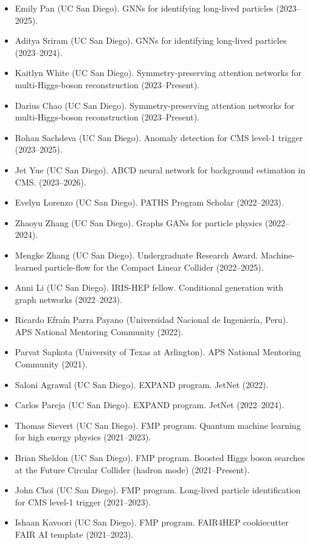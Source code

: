 \documentclass[11pt]{res}
\begin{document}
\begin{resume}
\begin{itemize}
    \item Emily Pan (UC San Diego). GNNs for identifying long-lived particles (2023--2025).
    \item Aditya Sriram (UC San Diego). GNNs for identifying long-lived particles (2023--2024).
    \item Kaitlyn White (UC San Diego). Symmetry-preserving attention networks for multi-Higgs-boson reconstruction (2023--Present).
    \item Darius Chao (UC San Diego). Symmetry-preserving attention networks for multi-Higgs-boson reconstruction (2023--Present).
    \item Rohan Sachdeva (UC San Diego). Anomaly detection for CMS level-1 trigger (2023--2025).
    \item Jet Yue (UC San Diego). ABCD neural network for background estimation in CMS. ({2023--2026}).
    \item Evelyn Lorenzo (UC San Diego). PATHS Program Scholar (2022--2023).
    \item Zhaoyu Zhang (UC San Diego). Graphs GANs for particle physics ({2022--2024}).
    \item Mengke Zhang (UC San Diego). Undergraduate Research Award. Machine-learned particle-flow for the Compact Linear Collider ({2022--2025}).
    \item Anni Li (UC San Diego). IRIS-HEP fellow. Conditional generation with graph networks ({2022--2023}).
    \item Ricardo Efra\'{i}n Parra Payano (Universidad Nacional de Ingenier\'{i}a, Peru). APS National Mentoring Community ({2022}).
    \item Parvat Sapkota (University of Texas at Arlington). APS National Mentoring Community ({2021}).
    \item Saloni Agrawal (UC San Diego). EXPAND program. JetNet ({2022}).
    \item Carlos Pareja (UC San Diego). EXPAND program. JetNet ({2022--2024}).
    \item Thomas Sievert (UC San Diego). FMP program. Quantum machine learning for high energy physics ({2021--2023}).
    \item Brian Sheldon (UC San Diego). FMP program. Boosted Higgs boson searches at the Future Circular Collider (hadron mode) ({2021--Present}).
    \item John Choi (UC San Diego). FMP program. Long-lived particle identification for CMS level-1 trigger ({2021--2023}).
    \item Ishaan Kavoori (UC San Diego). FMP program. FAIR4HEP cookiecutter FAIR AI template ({2021--2023}).

\end{itemize}
\end{resume}
\end{document}
